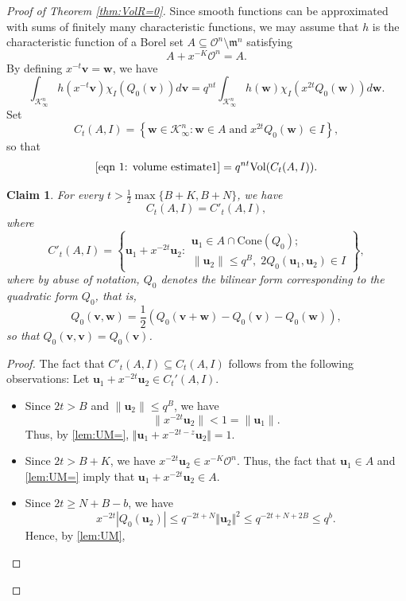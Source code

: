 \documentclass[11pt,a4paper,reqno]{amsart}
\def\vol{\mathrm{Vol}}
\newcommand{\Cone}{\mathrm{Cone}}
\newtheorem{claim}[theorem]{Claim}
\theoremstyle{definition}
\theoremstyle{remark}
\numberwithin{equation}{section}
\begin{document}
\begin{proof}[Proof of Theorem \ref{thm:VolR=0}]
Since smooth functions can be approximated with sums of finitely many characteristic functions, we may assume that $h$ is the characteristic function of a Borel set $A\subseteq \mathcal{O}^n\setminus \mathfrak{m}^n$ satisfying
$$A+x^{-K}\mathcal{O}^n=A.$$
By defining $x^{-t}\mathbf v=\mathbf w$, we have
\begin{equation}\label{eqn 1: volume estimate1}
\int_{\mathcal K_\infty^n} h(x^{-t}\mathbf v) \chi^{}_I(Q_0(\mathbf v)) d\mathbf v
=q^{nt}\int_{\mathcal K_\infty^n} h(\mathbf w) \chi^{}_I(x^{2t}Q_0(\mathbf w)) d\mathbf w.
\end{equation}
Set
\[
C_t(A,I)=\left\{\mathbf w\in \mathcal K_\infty^n: \mathbf w \in A\;\text{and}\;  x^{2t}Q_0(\mathbf w)\in I\right\},
\]
so that
\[
\eqref{eqn 1: volume estimate1}= q^{nt} \vol(C_t(A,I)).
\]
\begin{claim}
For every $t>\frac{1}{2}\max\{B+K, B+N\}$, we have
\[
C_t(A,I)=C'_t(A,I),
\]
where
\[
C'_t(A,I)=\left\{\mathbf u_1+ x^{-2t} \mathbf u_2: \begin{array}{c}
\mathbf u_1\in A\cap \Cone(Q_0);\\[0.05in]
\|\mathbf u_2\|\le q^B,\; 2Q_0(\mathbf u_1, \mathbf u_2)\in I
\end{array}\right\},
\]
where by abuse of notation, $Q_0$ denotes the bilinear form corresponding to the quadratic form $Q_0$, that is, $$Q_0(\mathbf v, \mathbf w)=\frac 1 2\left(Q_0(\mathbf v+\mathbf w)-Q_0(\mathbf v)-Q_0(\mathbf w)\right),$$
so that $Q_0(\mathbf{v},\mathbf{v})=Q_0(\mathbf{v})$.
\end{claim}
\begin{proof}
The fact that $C'_t(A,I) \subseteq C_t(A,I)$ follows from the following observations: Let $\mathbf{u}_1+x^{-2t}\mathbf{u}_2\in C_t'(A,I)$.
\begin{itemize}
\item Since $2t>B$ and $\|\mathbf u_2\|\le q^B$, we have 
\[\|x^{-2t} \mathbf u_2\|<1=\|\mathbf u_1\|.\] 
Thus, by \eqref{lem:UM=}, $\Vert \mathbf{u}_1+x^{-2t-z}\mathbf{u}_2\Vert=1$.
\vspace{1pt}
\item Since $2t> B+K$, we have $x^{-2t}\mathbf u_2 \in x^{-K}\mathcal O^n$. Thus, the fact that $\mathbf{u}_1\in A$ and \eqref{lem:UM=} imply that $\mathbf{u}_1+x^{-2t}\mathbf{u}_2\in A$. 
\vspace{1pt}
\item Since $2t\geq N+B-b$, we have 
$$x^{-2t}|Q_0(\mathbf u_2)|\leq q^{-2t+N}\Vert \mathbf{u}_2\Vert^2\le q^{-2t+N+2B}\le q^b.$$ Hence, by \eqref{lem:UM},

\end{itemize}
\end{proof}
\end{proof}
\end{document}
